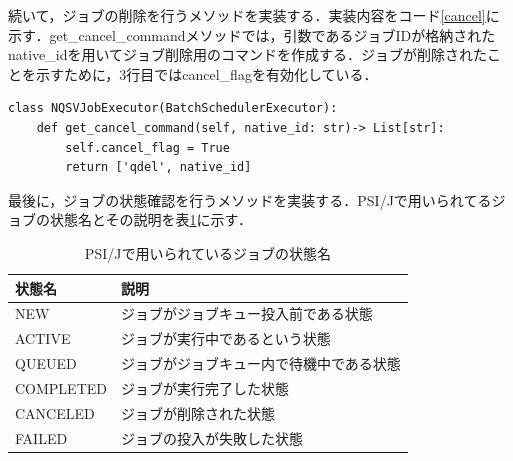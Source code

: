 続いて，ジョブの削除を行うメソッドを実装する．実装内容をコード\ref{cancel}に示す．get\_cancel\_commandメソッドでは，引数であるジョブIDが格納されたnative\_idを用いてジョブ削除用のコマンドを作成する．ジョブが削除されたことを示すために，3行目ではcancel\_flagを有効化している．\par

\begin{lstlisting}[caption=ジョブの削除メソッド, label=cancel]
class NQSVJobExecutor(BatchSchedulerExecutor):    
    def get_cancel_command(self, native_id: str)-> List[str]:
        self.cancel_flag = True
        return ['qdel', native_id]
\end{lstlisting}

最後に，ジョブの状態確認を行うメソッドを実装する．PSI/Jで用いられてるジョブの状態名とその説明を表\ref{PSIJstatus}に示す．\par

\begin{table}[b]
    \centering
    \caption{PSI/Jで用いられているジョブの状態名}
    \begin{tabular}{|l|l|}
    \hline
    状態名       & 説明                  \\ \hline
    NEW       & ジョブがジョブキュー投入前である状態     \\ \hline
    ACTIVE    & ジョブが実行中であるという状態     \\ \hline
    QUEUED    & ジョブがジョブキュー内で待機中である状態 \\ \hline
    COMPLETED & ジョブが実行完了した状態        \\ \hline
    CANCELED  & ジョブが削除された状態         \\ \hline
    FAILED    & ジョブの投入が失敗した状態       \\ \hline
    \end{tabular}
    \label{PSIJstatus}
\end{table}

